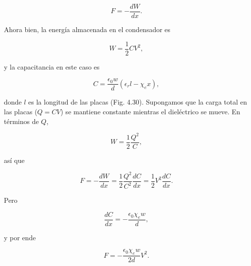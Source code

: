 \documentclass[12pt,a4paper]{report}
\newcommand{\esp}{\vspace{0.5cm}}
\begin{document}
	\esp
	
	\begin{equation}
		F = -\frac{dW}{dx}.
	\end{equation}
	
	\esp
	
	\noindent Ahora bien, la energía almacenada en el condensador es
	
	\esp
	
	\begin{equation}
		W = \frac{1}{2}CV^2,
	\end{equation}
	
	\esp
	
	\noindent y la capacitancia en este caso es
	
	\esp
	
	\begin{equation}
		C = \frac{\epsilon_0 w}{d}(\epsilon_r l - \chi_e x),
	\end{equation}
	
	\esp
	
	\noindent donde $l$ es la longitud de las placas (Fig. 4.30). Supongamos que la carga total en las placas ($Q = CV$) se mantiene constante mientras el dieléctrico se mueve. En términos de $Q$,
	
	\esp
	
	\begin{equation}
		W = \frac{1}{2} \frac{Q^2}{C},
	\end{equation}
	
	\esp
	
	así que
	
	\esp
	
	\begin{equation}
		F = -\frac{dW}{dx} = \frac{1}{2} \frac{Q^2}{C^2} \frac{dC}{dx} = \frac{1}{2} V^2 \frac{dC}{dx} . \tag{4.64}
	\end{equation}
	
	\esp
	
	\noindent Pero
	
	\esp
	
	\begin{equation}
		\frac{dC}{dx} = -\frac{\epsilon_0 \chi_e w}{d} ,
	\end{equation}
	
	\esp
	
	\noindent y por ende
	
	\esp
	
	\begin{equation}
		F = -\frac{\epsilon_0 \chi_e w}{2d} V^2 . \tag{4.65}
	\end{equation}
	
\end{document}
